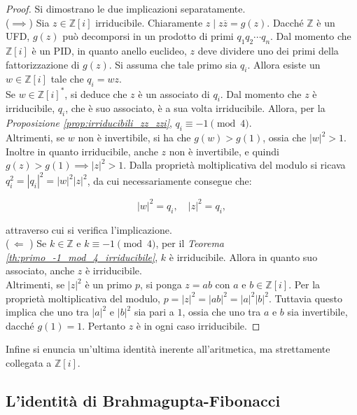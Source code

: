\documentclass[a4paper]{article}
\newcommand{\norm}[1]{\left|#1\right|}
\newcommand{\ZZ}{\mathbb{Z}}
\newcommand{\ZZi}{\mathbb{Z}[i]}
\theoremstyle{definition}
\begin{document}
\begin{proof} Si dimostrano le due implicazioni separatamente. \\

    ($\implies$)\; Sia $z \in \ZZi$ irriducibile. Chiaramente
    $z \mid z \overline{z} = g(z)$. Dacché $\ZZ$ è un UFD,
    $g(z)$ può decomporsi in un prodotto di primi $q_1q_2\cdots q_n$.
    Dal momento che $\ZZi$ è un PID, in quanto anello euclideo,
    $z$ deve dividere uno dei primi della fattorizzazione di
    $g(z)$. Si assuma che tale primo sia $q_i$. Allora esiste
    un $w \in \ZZi$ tale che $q_i=wz$. \\

    Se $w \in \ZZi^*$, si
    deduce che $z$ è un associato di $q_i$. Dal momento che
    $z$ è irriducibile, $q_i$, che è suo associato, è a sua
    volta irriducibile. Allora, per la \textit{Proposizione \ref{prop:irriducibili_zz_zzi}}, $q_i \equiv -1 \pmod4$.
    \\

    Altrimenti, se $w$ non è invertibile, si ha che $g(w)>g(1)$,
    ossia che $\norm{w}^2>1$. Inoltre in quanto irriducibile, anche
    $z$ non è invertibile, e quindi
    $g(z)>g(1) \implies \norm{z}^2>1$. Dalla proprietà
    moltiplicativa
    del modulo si ricava $q_i^2 = \norm{q_i}^2 = \norm{w}^2 \norm{z}^2$,
    da cui necessariamente consegue che:

    \[ \norm{w}^2=q_i, \quad \norm{z}^2=q_i, \]

    attraverso cui si verifica l'implicazione. \\

    ($\,\Longleftarrow\,\,$)\; Se $k \in \ZZ$ e $k \equiv -1 \pmod4$, per
    il \textit{Teorema \ref{th:primo_-1_mod_4_irriducibile}}, $k$ è
    irriducibile. Allora in quanto suo associato, anche $z$ è irriducibile. \\

    Altrimenti, se $\norm{z}^2$ è un primo $p$, si ponga
    $z=ab$ con $a$ e $b \in \ZZi$. Per la proprietà moltiplicativa
    del modulo, $p = \norm{z}^2 = \norm{ab}^2 = \norm{a}^2\norm{b}^2$.
    Tuttavia questo implica che uno tra $\norm{a}^2$ e $\norm{b}^2$
    sia pari a $1$, ossia che uno tra $a$ e $b$ sia invertibile,
    dacché $g(1)=1$. Pertanto $z$ è in ogni caso irriducibile.
\end{proof}

Infine si enuncia un'ultima identità inerente all'aritmetica, ma
strettamente collegata a $\ZZi$.

\subsection{L'identità di Brahmagupta-Fibonacci}
\end{document}
